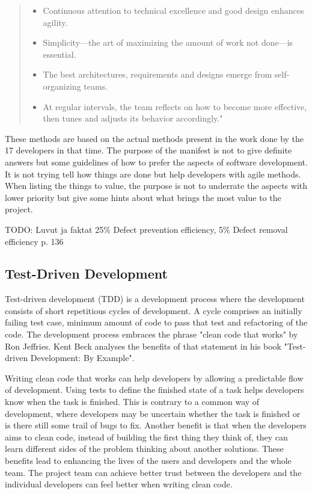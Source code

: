 \begin{quote}
\begin{itemize}
	\item Continuous attention to technical excellence and good design enhances agility.  
	\item Simplicity—the art of maximizing the amount of work not done—is essential.  
	\item The best architectures, requirements and designs emerge from self-organizing teams.  
	\item At regular intervals, the team reflects on how to become more effective, then tunes and adjusts its behavior accordingly."

	\end{itemize}

\end{quote}

These methods are based on the actual methods present in the work done by the 17 developers in that time. The purpose of the manifest is not to give definite answers but some guidelines of how to prefer the aspects of software development. It is not trying tell how things are done but help developers with agile methods. When listing the things to value, the purpose is not to underrate the aspects with lower priority but give some hints about what brings the most value to the project.


TODO: Luvut ja faktat 25\% Defect prevention efficiency, 5\% Defect removal efficiency p. 136

\subsection{Test-Driven Development} 
Test-driven development (TDD) is a development process where the development consists of short repetitious cycles of development. A cycle comprises an initially failing test case, minimum amount of code to pass that test and refactoring of the code. The development process embraces the phrase "clean code that works" by Ron Jeffries. Kent Beck analyses the benefits of that statement in his book "Test-driven Development: By Example".

Writing clean code that works can help developers by allowing a predictable flow of development. Using tests to define the finished state of a task helps developers know when the task is finished. This is contrary to a common way of development, where developers may be uncertain whether the task is finished or is there still some trail of bugs to fix. Another benefit is that when the developers aims to clean code, instead of building the first thing they think of, they can learn different sides of the problem thinking about another solutions. These benefits lead to enhancing the lives of the users and developers and the whole team. The project team can achieve better trust between the developers and the individual developers can feel better when writing clean code.

